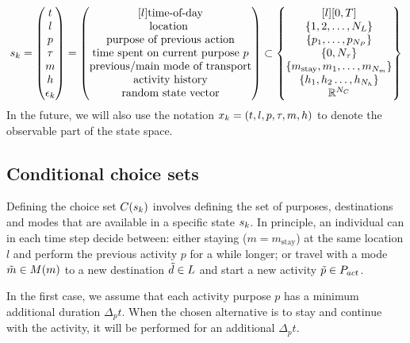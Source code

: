 \begin{equation}
    \s{k} = \begin{pmatrix}
    t \\
    l \\
    p \\
    \atime\\
    m \\
    \amem \\
    \epsilon_k
    \end{pmatrix} =
    \begin{pmatrix*}[l]
    \text{time-of-day} \\
    \text{location } \\
    \text{purpose of previous action} \\
    \text{time spent on current purpose $p$} \\
    \text{previous/main mode of transport} \\
    \text{activity history} \\
    \text{random state vector}
    \end{pmatrix*}
    \subset
    \begin{Bmatrix*}[l]
    [0,T] \\
    \{1,2,\dots, N_L\} \\
    \{p_1,\dots,p_{N_P}\} \\
    \{0,N_{\atime}\} \\
    \{m_{\text{stay}},m_1,\dots,m_{N_m}\} \\
    \{\amem_1,\amem_2\dots,\amem_{N_\amem} \}\\
    \rr^{N_C}
    \end{Bmatrix*}
\end{equation}
In the future, we will also use the notation $x_k=(t,l,p,\tau,m,h)$ to denote the observable part of the state space.
\subsection{Conditional choice sets}
Defining the choice set $C(s_{k})$ involves defining the set of purposes, destinations and modes that are available in a specific state $s_{k}$.
In principle, an individual can in each time step decide between: either staying ($m=m_\text{stay}$) at the same location $l$ and perform the previous activity $p$ for a while longer; or travel with a mode $\tilde{m}\in M(m)$ to a new destination $\tilde{d} \in L$ and start a new activity $\tilde{p} \in P_{act}$. 

In the first case, we assume that each activity purpose $p$ has a minimum additional duration $\Delta_p t$. When the chosen alternative is to stay and continue with the activity, it will be performed for an additional $\Delta_p t$.

